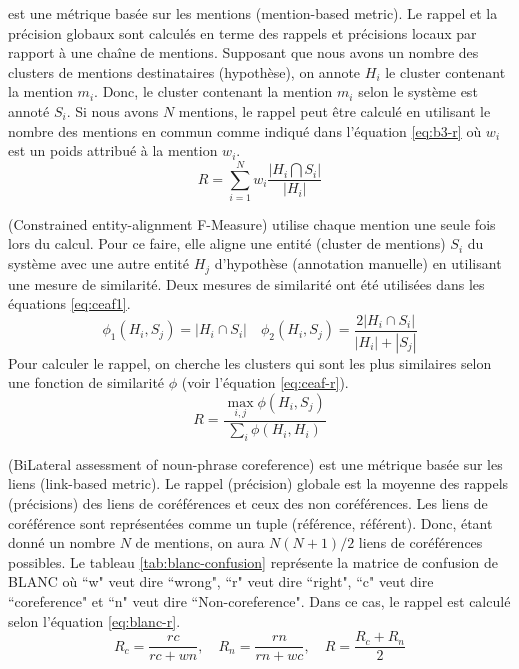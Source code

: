 \documentclass{KodeBook}
\begin{document}
 est une métrique basée sur les mentions (mention-based metric). 
Le rappel et la précision globaux sont calculés en terme des rappels et précisions locaux par rapport à une chaîne de mentions. 
Supposant que nous avons un nombre des clusters de mentions destinataires (hypothèse), on annote $H_i$ le cluster contenant la mention $m_i$. 
Donc, le cluster contenant la mention $m_i$ selon le système est annoté $S_i$. 
Si nous avons $N$ mentions, le rappel peut être calculé en utilisant le nombre des mentions en commun comme indiqué dans l'équation \ref{eq:b3-r} où $w_i$ est un poids attribué à la mention $w_i$. 
\begin{equation}\label{eq:b3-r}
R = \sum_{i=1}^{N} w_i \frac{|H_i \bigcap S_i|}{|H_i|}
\end{equation}

 (Constrained entity-alignment F-Measure) utilise chaque mention une seule fois lors du calcul. 
Pour ce faire, elle aligne une entité (cluster de mentions) $S_i$ du système avec une autre entité $H_j$ d'hypothèse (annotation manuelle) en utilisant une mesure de similarité. 
Deux mesures de similarité ont été utilisées dans les équations \ref{eq:ceaf1}.
\begin{equation}\label{eq:ceaf1}
\phi_1(H_i, S_j) = |H_i \cap S_i | \quad \phi_2(H_i, S_j) = \frac{2|H_i \cap S_i | }{|H_i| + |S_j|}
\end{equation}
Pour calculer le rappel, on cherche les clusters qui sont les plus similaires selon une fonction de similarité $\phi$ (voir l'équation \ref{eq:ceaf-r}).
\begin{equation}\label{eq:ceaf-r}
R = \frac{\max_{i,j} \phi(H_i, S_j)}{\sum_i \phi(H_i, H_i)}
\end{equation}


 (BiLateral assessment of noun-phrase coreference) est une métrique basée sur les liens (link-based metric). 
Le rappel (précision) globale est la moyenne des rappels (précisions) des liens de coréférences et ceux des non coréférences. 
Les liens de coréférence sont représentées comme un tuple (référence, référent).
Donc, étant donné un nombre $N$ de mentions, on aura $N (N+1)/2$ liens de coréférences possibles. 
Le tableau \ref{tab:blanc-confusion} représente la matrice de confusion de BLANC où ``w" veut dire ``wrong", ``r" veut dire ``right", ``c" veut dire ``coreference" et ``n" veut dire ``Non-coreference".
Dans ce cas, le rappel est calculé selon l'équation \ref{eq:blanc-r}.
\begin{equation}\label{eq:blanc-r}
R_c = \frac{rc}{rc+wn},\quad R_n = \frac{rn}{rn+wc},\quad R = \frac{R_c + R_n}{2}
\end{equation}
\end{document}
